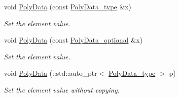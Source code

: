 \begin{DoxyCompactItemize}
void \hyperlink{classVTKFile__t_ab0a3f2aa2894d0384a89a6e5490c9372}{Poly\-Data} (const \hyperlink{classVTKFile__t_a4588b4f0e28ba09aa219bda7e1fc6c97}{Poly\-Data\-\_\-type} \&x)
\begin{DoxyCompactList}\small\item\em Set the element value. \end{DoxyCompactList}\item 
void \hyperlink{classVTKFile__t_a1c2a800d41431c04965c863220a3b1b5}{Poly\-Data} (const \hyperlink{classVTKFile__t_aacb796775ae228cd61726a23b809f3e4}{Poly\-Data\-\_\-optional} \&x)
\begin{DoxyCompactList}\small\item\em Set the element value. \end{DoxyCompactList}\item 
void \hyperlink{classVTKFile__t_a8ae292e04bf2c955d8f50cdeb60f9369}{Poly\-Data} (\-::std\-::auto\-\_\-ptr$<$ \hyperlink{classVTKFile__t_a4588b4f0e28ba09aa219bda7e1fc6c97}{Poly\-Data\-\_\-type} $>$ p)
\begin{DoxyCompactList}\small\item\em Set the element value without copying. \end{DoxyCompactList}\end{DoxyCompactItemize}

